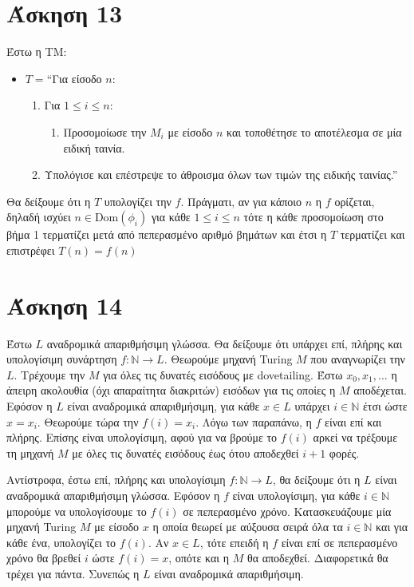 \documentclass[a4paper, oneside, 11pt]{article}
\theoremstyle{definition}
\begin{document}
\section*{Άσκηση 13}

Έστω η ΤΜ:

\begin{itemize}
\item $T = $``Για είσοδο $n$:
      \begin{enumerate}
      \item Για $1 \leq i \leq n$:
            \begin{enumerate}
            \item Προσομοίωσε την $M_i$ με είσοδο $n$ και τοποθέτησε το αποτέλεσμα σε
                  μία ειδική ταινία.
            \end{enumerate}
      \item Υπολόγισε και επέστρεψε το άθροισμα όλων των τιμών της ειδικής ταινίας.''
      \end{enumerate}
\end{itemize}

Θα δείξουμε ότι η $T$ υπολογίζει την $f$. Πράγματι, αν για κάποιο $n$ η $f$ ορίζεται,
δηλαδή ισχύει
$n \in \text{Dom}(\phi_i)$ για κάθε $1 \leq i \leq n$ τότε η 
κάθε προσομοίωση στο βήμα 1 τερματίζει μετά από πεπερασμένο αριθμό βημάτων και έτσι η
$T$ τερματίζει και επιστρέφει $T(n) = f(n)$

\section*{Άσκηση 14}

Έστω $L$ αναδρομικά απαριθμήσιμη γλώσσα. Θα δείξουμε ότι υπάρχει επί, πλήρης και υπολογίσιμη
συνάρτηση $f:\mathbb{N}\rightarrow L$. Θεωρούμε μηχανή Turing $M$ που αναγνωρίζει την $L$.
Τρέχουμε την $M$ για όλες τις δυνατές εισόδους με dovetailing. Έστω $x_0, x_1, ... $ η άπειρη
ακολουθία (όχι απαραίτητα διακριτών) εισόδων για τις οποίες η $M$ αποδέχεται. Εφόσον η $L$ είναι
αναδρομικά απαριθμήσιμη, για κάθε $x\in L$ υπάρχει $i\in \mathbb{N}$ έτσι ώστε $x=x_i$.
Θεωρούμε τώρα την $f(i) = x_i$. Λόγω των παραπάνω, η $f$ είναι επί και πλήρης. Επίσης είναι
υπολογίσιμη, αφού για να βρούμε το $f(i)$ αρκεί να τρέξουμε τη μηχανή $M$ με όλες τις δυνατές
εισόδους έως ότου αποδεχθεί $i+1$ φορές. 

Αντίστροφα, έστω επί, πλήρης και υπολογίσιμη $f:\mathbb{N}\rightarrow L$, θα δείξουμε ότι η $L$
είναι αναδρομικά απαριθμήσιμη γλώσσα. Εφόσον η $f$ είναι υπολογίσιμη, για κάθε $i\in \mathbb{N}$
μπορούμε να υπολογίσουμε το $f(i)$ σε πεπερασμένο χρόνο. Κατασκευάζουμε μία μηχανή Turing $M$
με είσοδο $x$ η οποία θεωρεί με αύξουσα σειρά όλα τα $i\in \mathbb{N}$ και για κάθε ένα, 
υπολογίζει το $f(i)$. Αν $x\in L$, τότε επειδή η $f$ είναι επί σε πεπερασμένο χρόνο 
θα βρεθεί $i$ ώστε $f(i)=x$, οπότε και
η $M$ θα αποδεχθεί. Διαφορετικά θα τρέχει για πάντα. Συνεπώς η $L$ είναι αναδρομικά απαριθμήσιμη.
\end{document}
